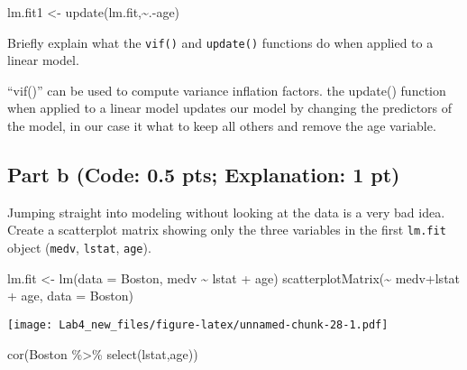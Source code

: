 \documentclass[
]{article}
\newenvironment{Shaded}{\begin{snugshade}}{\end{snugshade}}
\newcommand{\AttributeTok}[1]{\textcolor[rgb]{0.77,0.63,0.00}{#1}}
\newcommand{\FunctionTok}[1]{\textcolor[rgb]{0.00,0.00,0.00}{#1}}
\newcommand{\NormalTok}[1]{#1}
\newcommand{\OtherTok}[1]{\textcolor[rgb]{0.56,0.35,0.01}{#1}}
\newcommand{\SpecialCharTok}[1]{\textcolor[rgb]{0.00,0.00,0.00}{#1}}
\begin{document}
\begin{Shaded}
\begin{Highlighting}[]
\NormalTok{lm.fit1 }\OtherTok{\textless{}{-}} \FunctionTok{update}\NormalTok{(lm.fit,}\SpecialCharTok{\textasciitilde{}}\NormalTok{.}\SpecialCharTok{{-}}\NormalTok{age)}
\end{Highlighting}
\end{Shaded}

Briefly explain what the \texttt{vif()} and \texttt{update()} functions
do when applied to a linear model.

``vif()'' can be used to compute variance inflation factors. the
update() function when applied to a linear model updates our model by
changing the predictors of the model, in our case it what to keep all
others and remove the age variable.

\hypertarget{part-b-code-0.5-pts-explanation-1-pt}{%
\subsection{Part b (Code: 0.5 pts; Explanation: 1
pt)}\label{part-b-code-0.5-pts-explanation-1-pt}}

Jumping straight into modeling without looking at the data is a very bad
idea. Create a scatterplot matrix showing only the three variables in
the first \texttt{lm.fit} object (\texttt{medv}, \texttt{lstat},
\texttt{age}).

\begin{Shaded}
\begin{Highlighting}[]
\NormalTok{lm.fit }\OtherTok{\textless{}{-}} \FunctionTok{lm}\NormalTok{(}\AttributeTok{data =}\NormalTok{ Boston, medv }\SpecialCharTok{\textasciitilde{}}\NormalTok{ lstat }\SpecialCharTok{+}\NormalTok{ age)}
\FunctionTok{scatterplotMatrix}\NormalTok{(}\SpecialCharTok{\textasciitilde{}}\NormalTok{ medv}\SpecialCharTok{+}\NormalTok{lstat }\SpecialCharTok{+}\NormalTok{ age, }\AttributeTok{data =}\NormalTok{ Boston)}
\end{Highlighting}
\end{Shaded}

\texttt{[image: Lab4\_new\_files/figure-latex/unnamed-chunk-28-1.pdf]}

\begin{Shaded}
\begin{Highlighting}[]
\FunctionTok{cor}\NormalTok{(Boston }\SpecialCharTok{\%\textgreater{}\%} \FunctionTok{select}\NormalTok{(lstat,age))}
\end{Highlighting}
\end{Shaded}
\end{document}
